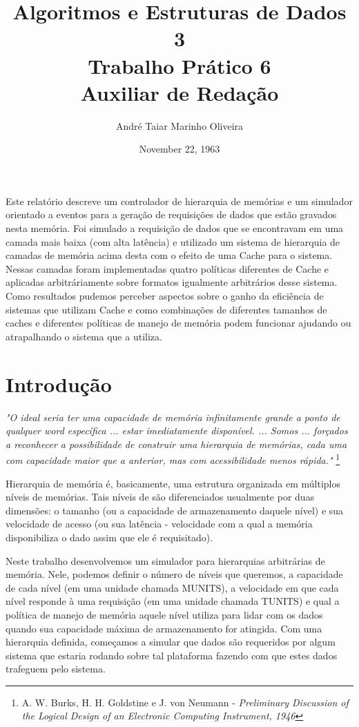 \documentclass[12pt]{article}
\title{Algoritmos e Estruturas de Dados 3 \\ Trabalho Prático 6 \\
\huge{Auxiliar de Redação}}
\date{November 22, 1963}
\author{André Taiar Marinho Oliveira}
\begin{document}
\maketitle

\begin{resumo}
\label{resumo}
Este relatório descreve um controlador de hierarquia de memórias e um simulador orientado a eventos para a geração de requisições de dados que estão gravados nesta memória. Foi simulado a requisição de dados que se encontravam em uma camada mais baixa (com alta latência) e utilizado um sistema de hierarquia de camadas de memória acima desta com o efeito de uma Cache para o sistema. Nessas camadas foram implementadas quatro políticas diferentes de Cache e aplicadas arbitráriamente sobre formatos igualmente arbitrários desse sistema. Como resultados pudemos perceber aspectos sobre o ganho da eficiência de sistemas que utilizam Cache e como combinações de diferentes tamanhos de caches e diferentes políticas de manejo de memória podem funcionar ajudando ou atrapalhando o sistema que a utiliza.
\end{resumo}

\section{Introdução}
\label{introducao}
\textit{"O ideal seria ter uma capacidade de memória infinitamente grande a ponto de qualquer word específica ... estar imediatamente disponível. ... Somos ... forçados a reconhecer a possibilidade de construir uma hierarquia de memórias, cada uma com capacidade maior que a anterior, mas com acessibilidade menos rápida."} \footnote{A. W. Burks, H. H. Goldstine e J. von Neumann - \textit{Preliminary Discussion of the Logical Design of an Electronic Computing Instrument, 1946}}

Hierarquia de memória é, basicamente, uma estrutura organizada em múltiplos níveis de memórias. Tais níveis de são diferenciados usualmente por duas dimensões: o tamanho (ou a capacidade de armazenamento daquele nível) e sua velocidade de acesso (ou sua latência - velocidade com a qual a memória disponibiliza o dado assim que ele é requisitado).

Neste trabalho desenvolvemos um simulador para hierarquias arbitrárias de memória. Nele, podemos definir o número de níveis que queremos, a capacidade de cada nível (em uma unidade chamada MUNITS), a velocidade em que cada nível responde à uma requisição (em uma unidade chamada TUNITS) e qual a política de manejo de memória aquele nível utiliza para lidar com os dados quando sua capacidade máxima de armazenamento for atingida. Com uma hierarquia definida, começamos a simular que dados são requeridos por algum sistema que estaria rodando sobre tal plataforma fazendo com que estes dados trafeguem pelo sistema.
\end{document}
